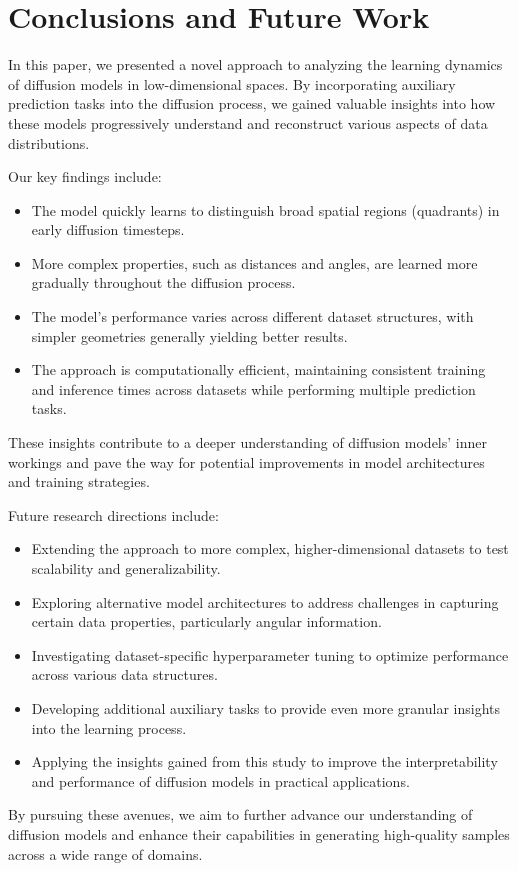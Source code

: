 \documentclass{article} %
\begin{document}
\section{Conclusions and Future Work}
\label{sec:conclusion}

In this paper, we presented a novel approach to analyzing the learning dynamics of diffusion models in low-dimensional spaces. By incorporating auxiliary prediction tasks into the diffusion process, we gained valuable insights into how these models progressively understand and reconstruct various aspects of data distributions.

Our key findings include:
\begin{itemize}
    \item The model quickly learns to distinguish broad spatial regions (quadrants) in early diffusion timesteps.
    \item More complex properties, such as distances and angles, are learned more gradually throughout the diffusion process.
    \item The model's performance varies across different dataset structures, with simpler geometries generally yielding better results.
    \item The approach is computationally efficient, maintaining consistent training and inference times across datasets while performing multiple prediction tasks.
\end{itemize}

These insights contribute to a deeper understanding of diffusion models' inner workings and pave the way for potential improvements in model architectures and training strategies.

Future research directions include:
\begin{itemize}
    \item Extending the approach to more complex, higher-dimensional datasets to test scalability and generalizability.
    \item Exploring alternative model architectures to address challenges in capturing certain data properties, particularly angular information.
    \item Investigating dataset-specific hyperparameter tuning to optimize performance across various data structures.
    \item Developing additional auxiliary tasks to provide even more granular insights into the learning process.
    \item Applying the insights gained from this study to improve the interpretability and performance of diffusion models in practical applications.
\end{itemize}

By pursuing these avenues, we aim to further advance our understanding of diffusion models and enhance their capabilities in generating high-quality samples across a wide range of domains.



\end{document}
